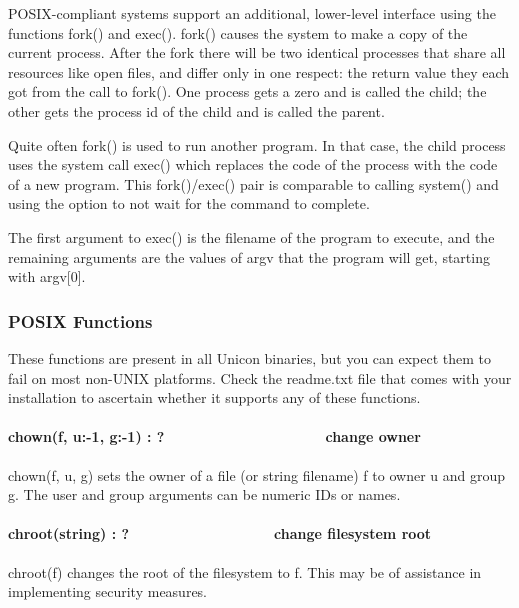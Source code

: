 POSIX-compliant systems support an additional, lower-level interface
using the functions fork() and exec(). fork() causes the
system to make a copy of the current process. After the fork there will
be two identical processes that share all resources like open files,
and differ only in one respect: the return value they each got from the
call to fork(). One process gets a zero and is called the child; the
other gets the process id of the child and is called the parent.

Quite often fork() is used to run another program. In that case, the
child process uses the system call exec() which replaces the code of
the process with the code of a new program. This fork()/exec() pair is
comparable to calling system() and using the option to not wait for the
command to complete.

The first argument to exec() is the filename of the program to execute,
and the remaining arguments are the values of argv that the program
will get, starting with argv[0]. 


\subsubsection{POSIX Functions}

These functions are present in all Unicon binaries, but you can expect
them to fail on most non-UNIX platforms. Check the readme.txt file that
comes with your installation to ascertain whether it supports any of
these functions.

\paragraph[chown(f, u:{}-1, g:{}-1) : ?\ \ \ \ \ \ \ \ \ \ \ \ 
\ \ \ \ \ \ \ \ change owner]{chown(f, u:-1, g:-1) :
?\ \ \ \ \ \ \ \ \ \ \ \  \ \ \ \ \ \ \ \ change owner}
chown(f, u, g) sets the owner of a file (or string filename) f to owner
u and group g. The user and group arguments can be numeric
ID{\textquotesingle}s or names.

\paragraph[chroot(string) : ?\ \ \ \ \ \ \ \ \ \ \ \  \ \ \ \ \ \ change
filesystem root]{chroot(string) : ?\ \ \ \ \ \ \ \ \ \ \ \ 
\ \ \ \ \ \ change filesystem root}
chroot(f) changes the root of the filesystem to f. This may be of
assistance in implementing security measures.


